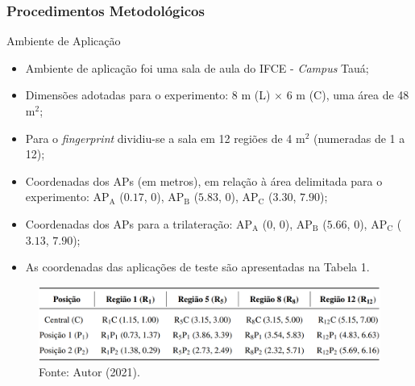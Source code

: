 \documentclass[xcolor={dvipsnames,svgnames,table}]{beamer}
\begin{document}
	\begin{frame}
		\frametitle{Procedimentos Metodológicos}	
		\begin{block}{Ambiente de Aplicação}
			\begin{itemize}[label=\textcolor{black}{\textbullet}, left=5pt]
				\justifying
				\item Ambiente de aplicação foi uma sala de aula do IFCE - \textit{Campus} Tauá;
				\item Dimensões adotadas para o experimento: 8 m (L) $\times$ 6 m (C), uma área de 48 m$^2$;
				\item Para o \textit{fingerprint} dividiu-se a sala em 12 regiões de 4 m$^2$ (numeradas de 1 a 12);
				\item Coordenadas dos APs (em metros), em relação à área delimitada para o experimento: AP$_\text{A}$ ($0.17$, $0$), AP$_\text{B}$ ($5.83$, $0$), AP$_\text{C}$ ($3.30$, $7.90$);
				\item Coordenadas dos APs para a trilateração: AP$_\text{A}$ ($0$, $0$), AP$_\text{B}$ ($5.66$, $0$), AP$_\text{C}$ ($3.13$, $7.90$);
				\item As coordenadas das aplicações de teste são apresentadas na Tabela 1.
			\end{itemize}
		\end{block}
		\begin{figure}
			\caption*{Tabela 1: Coordenadas das posições de coleta}
			\vspace{-5pt}
			\centering
			\includegraphics[width=0.78\linewidth]{imgs/tabela_regioes.PNG}
			\vspace{-5pt}
			\caption*{\tiny{Fonte: Autor (2021).}}
		\end{figure}
	\end{frame}
\end{document}
